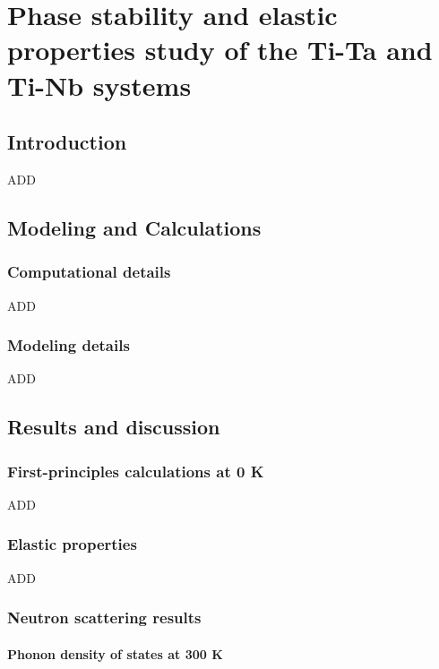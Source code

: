 \chapter{Phase stability and elastic properties study of the Ti-Ta and Ti-Nb systems}

\section{Introduction}

ADD

\section{Modeling and Calculations}

\subsection{Computational details}

ADD

\subsection{Modeling details}

ADD

\section{Results and discussion}

\subsection{First-principles calculations at 0 K}

ADD

\subsection{Elastic properties}

ADD

\subsection{Neutron scattering results}

\subsubsection{Phonon density of states at 300 K}


